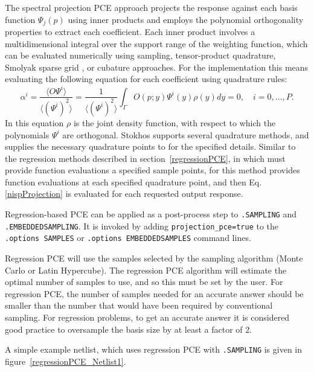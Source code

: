 The spectral projection PCE approach projects the response
against each basis function $\Psi_j(p)$ using inner
products and employs the polynomial orthogonality properties to
extract each coefficient. Each inner product involves a
multidimensional integral over the support range of the weighting
function, which can be evaluated numerically using sampling,
tensor-product quadrature, Smolyak sparse grid \cite{Smolyak_63}, or
cubature \cite{stroud} approaches.   For the \Xyce{} implementation 
this means evaluating the following equation for each coefficient using 
quadrature rules:
\begin{equation}
\alpha^{i} = \frac{\langle O\varPsi ^{i}\rangle} {\langle (\varPsi ^{i})^{2}\rangle} = \frac{1} {\langle (\varPsi^{i})^{2}\rangle}\int _{\varGamma}O(p ;y)\varPsi ^{i}(y)\rho (y)dy = 0,\quad i = 0,\ldots,P.
  \label{nispProjection}
\end{equation}
In this equation $\rho$ is the joint density function, with respect to which the polynomials $\varPsi^i$ are orthogonal.
Stokhos supports several quadrature methods, and supplies the necessary quadrature points 
to \Xyce{} for the specified details.  Similar to the regression methods 
described in section~\ref{regressionPCE}, in which \Xyce{} must provide function 
evaluations a specified sample points, for this method \Xyce{} provides 
function evaluations at each specified quadrature point, and then Eq. \eqref{nispProjection}
is evaluated for each requested output response.

Regression-based PCE can be applied as a post-process step 
to \texttt{.SAMPLING} and \texttt{.EMBEDDEDSAMPLING}.  It is invoked by adding 
\texttt{projection\_pce=true} to the \texttt{.options SAMPLES} 
or \texttt{.options EMBEDDEDSAMPLES} command lines.  

Regression PCE will use the samples selected by the sampling algorithm (Monte Carlo or Latin Hypercube).  
The regression PCE algorithm will estimate the optimal number of samples to use, and so this must 
be set by the user.   For regression PCE, the number of samples needed for an accurate answer
should be smaller than the number that would have been required by conventional sampling.
For regression problems, to get an accurate answer it is considered good practice to oversample 
the basis size by at least a factor of 2. 

A simple example netlist, which uses regression PCE 
with \texttt{.SAMPLING} is given in figure~\ref{regressionPCE_Netlist1}.


